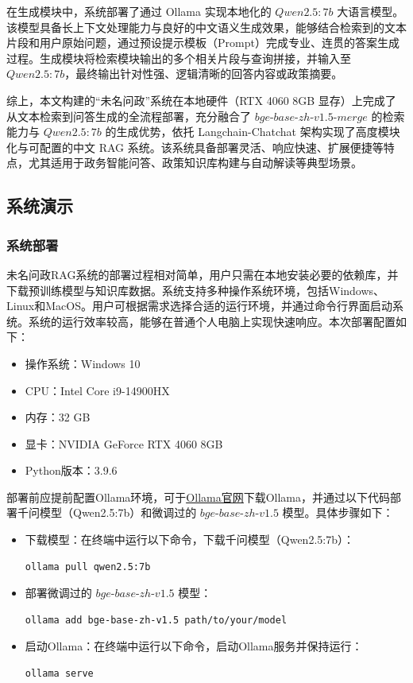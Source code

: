 \documentclass[12pt, a4paper]{ctexart}
\begin{document}
在生成模块中，系统部署了通过 Ollama 实现本地化的 $Qwen2.5:7b$ 大语言模型。该模型具备长上下文处理能力与良好的中文语义生成效果，能够结合检索到的文本片段和用户原始问题，通过预设提示模板（Prompt）完成专业、连贯的答案生成过程。生成模块将检索模块输出的多个相关片段与查询拼接，并输入至 $Qwen2.5:7b$，最终输出针对性强、逻辑清晰的回答内容或政策摘要。

综上，本文构建的“未名问政”系统在本地硬件（RTX 4060 8GB 显存）上完成了从文本检索到问答生成的全流程部署，充分融合了 $bge\text{-}base\text{-}zh\text{-}v1.5\text{-}merge$ 的检索能力与 $Qwen2.5:7b$ 的生成优势，依托 Langchain-Chatchat 架构实现了高度模块化与可配置的中文 RAG 系统。该系统具备部署灵活、响应快速、扩展便捷等特点，尤其适用于政务智能问答、政策知识库构建与自动解读等典型场景。

\subsection{系统演示}

\subsubsection{系统部署}
未名问政RAG系统的部署过程相对简单，用户只需在本地安装必要的依赖库，并下载预训练模型与知识库数据。系统支持多种操作系统环境，包括Windows、Linux和MacOS。用户可根据需求选择合适的运行环境，并通过命令行界面启动系统。系统的运行效率较高，能够在普通个人电脑上实现快速响应。本次部署配置如下：
\begin{itemize}
    \item 操作系统：Windows 10
    \item CPU：Intel Core i9-14900HX
    \item 内存：32 GB
    \item 显卡：NVIDIA GeForce RTX 4060 8GB
    \item Python版本：3.9.6
\end{itemize}

部署前应提前配置Ollama环境，可于\href{https://ollama.com/}{\underline{Ollama官网}}下载Ollama，并通过以下代码部署千问模型（Qwen2.5:7b）和微调过的 $bge\text{-}base\text{-}zh\text{-}v1.5$ 模型。具体步骤如下：
\begin{itemize}
    \item 下载模型：在终端中运行以下命令，下载千问模型（Qwen2.5:7b）：
    \begin{lstlisting}[language=bash]
        ollama pull qwen2.5:7b
    \end{lstlisting}
    \item 部署微调过的 $bge\text{-}base\text{-}zh\text{-}v1.5$ 模型：
    \begin{lstlisting}[language=bash]
        ollama add bge-base-zh-v1.5 path/to/your/model
    \end{lstlisting}
    \item 启动Ollama：在终端中运行以下命令，启动Ollama服务并保持运行：
    \begin{lstlisting}[language=bash]
        ollama serve
    \end{lstlisting}
\end{itemize}
\end{document}
